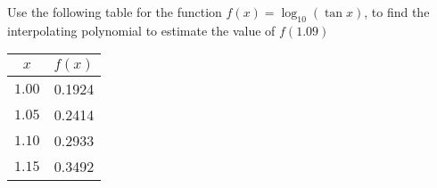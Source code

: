 \documentclass[12pt,class=book,crop=false]{standalone}
\begin{document}
\begin{prob}
    Use the following table for the function \(  f(x)=\log_{10}(\tan x) \), to find the interpolating polynomial to estimate the value of \(  f(1.09) \)
    \begin{center}
        \begin{tabular}{cS[table-format=2.4]}
            \toprule
            \(  x \)    &  \\\midrule
            \(  1.00 \)   &  0.1924  \\
            \(  1.05 \)  &   0.2414 \\
            \(  1.10 \)   &  0.2933  \\
            \(  1.15 \)   &  0.3492  \\\bottomrule
        \end{tabular}
    \end{center}
\end{prob}
\newpage
\end{document}
